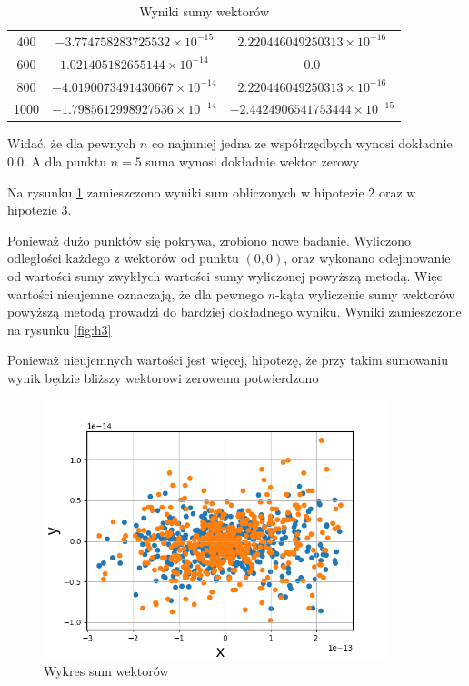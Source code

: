 \documentclass[12pt,a4paper]{article}
\begin{document}
\begin{table}[htbp]
\begin{tabular}{| c | c | c |}
    400 & $-3.774758283725532 \times 10^{-15}$ & $2.220446049250313 \times 10^{-16}$ \\
    600 & $1.021405182655144 \times 10^{-14}$ & $0.0$ \\
    800 & $-4.0190073491430667 \times 10^{-14}$ & $2.220446049250313 \times 10^{-16}$ \\
    1000 & $-1.7985612998927536 \times 10^{-14}$ & $-2.4424906541753444 \times 10^{-15}$ \\
    \hline
    \end{tabular}
    \caption{Wyniki sumy wektorów}
    \label{tab:h3}
\end{table}

Widać, że dla pewnych $n$ co najmniej jedna ze współrzędbych wynosi dokładnie $0.0$. A dla punktu $n = 5$ suma wynosi dokładnie wektor zerowy

Na rysunku \ref{fig:h3_} zamieszczono wyniki sum obliczonych w hipotezie 2 oraz w hipotezie 3.

Ponieważ dużo punktów się pokrywa, zrobiono nowe badanie. Wyliczono odległości każdego z wektorów od punktu $(0, 0)$, oraz wykonano odejmowanie od wartości sumy zwykłych wartości sumy wyliczonej powyższą metodą. Więc wartości nieujemne oznaczają, że dla pewnego $n$-kąta wyliczenie sumy wektorów powyższą metodą prowadzi do bardziej dokładnego wyniku. Wyniki zamieszczone na rysunku \ref{fig:h3}

Ponieważ nieujemnych wartości jest więcej, hipotezę, że przy takim sumowaniu wynik będzie bliższy wektorowi zerowemu potwierdzono
\begin{figure}[!htb]
    \centering
        \centering
        \includegraphics[width=10cm]{images/h3_.png}
        \caption{Wykres sum wektorów}
        \label{fig:h3_}
\end{figure}
\end{document}
